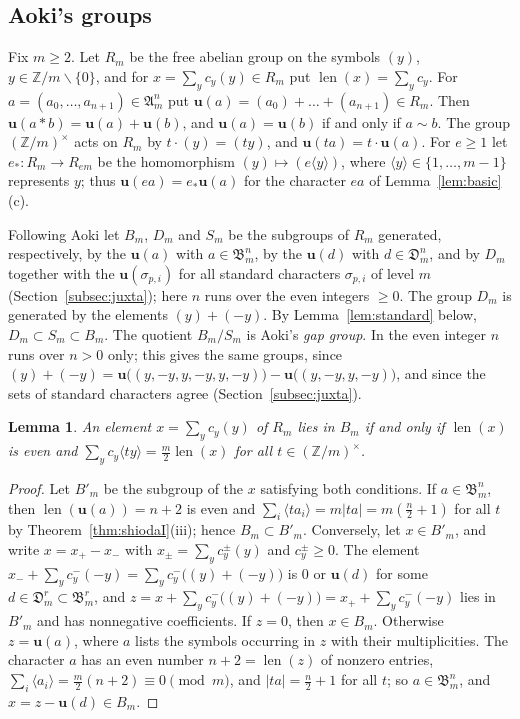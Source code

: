 \documentclass[11pt]{amsart}
\newtheorem{lemma}[theorem]{Lemma}
\theoremstyle{definition}
\theoremstyle{remark}
\numberwithin{equation}{section}
\newcommand{\Z}{\mathbb{Z}}
\newcommand{\fA}{\mathfrak{A}}
\newcommand{\fB}{\mathfrak{B}}
\newcommand{\fD}{\mathfrak{D}}
\newcommand{\uu}{\mathbf{u}}
\newcommand{\len}{\operatorname{len}}
\newcommand{\sm}{\smallsetminus}
\begin{document}
\subsection{Aoki's groups}\label{subsec:groups}
Fix $m\ge2$. Let $R_m$ be the free abelian group on the symbols $(y)$, $y\in\Z/m\sm\{0\}$, and for $x=\sum_yc_y(y)\in R_m$ put $\len(x)=\sum_yc_y$. For $a=(a_0,\dots,a_{n+1})\in\fA^n_m$ put $\uu(a)=(a_0)+\dots+(a_{n+1})\in R_m$. Then $\uu(a*b)=\uu(a)+\uu(b)$, and $\uu(a)=\uu(b)$ if and only if $a\sim b$. The group $(\Z/m)^\times$ acts on $R_m$ by $t\cdot(y)=(ty)$, and $\uu(ta)=t\cdot\uu(a)$. For $e\ge1$ let $e_*\colon R_m\to R_{em}$ be the homomorphism $(y)\mapsto(e\langle y\rangle)$, where $\langle y\rangle\in\{1,\dots,m-1\}$ represents $y$; thus $\uu(ea)=e_*\uu(a)$ for the character $ea$ of Lemma~\ref{lem:basic}(c).

Following Aoki \cite[Section~2]{Ao00} let $B_m$, $D_m$ and $S_m$ be the subgroups of $R_m$ generated, respectively, by the $\uu(a)$ with $a\in\fB^n_m$, by the $\uu(d)$ with $d\in\fD^n_m$, and by $D_m$ together with the $\uu(\sigma_{p,i})$ for all standard characters $\sigma_{p,i}$ of level $m$ (Section~\ref{subsec:juxta}); here $n$ runs over the even integers $\ge0$. The group $D_m$ is generated by the elements $(y)+(-y)$. By Lemma~\ref{lem:standard} below, $D_m\subset S_m\subset B_m$. The quotient $B_m/S_m$ is Aoki's \emph{gap group}. In \cite[Section~2]{Ao00} the even integer $n$ runs over $n>0$ only; this gives the same groups, since $(y)+(-y)=\uu\bigl((y,-y,y,-y,y,-y)\bigr)-\uu\bigl((y,-y,y,-y)\bigr)$, and since the sets of standard characters agree (Section~\ref{subsec:juxta}).

\begin{lemma}\label{lem:Blattice}
An element $x=\sum_yc_y(y)$ of $R_m$ lies in $B_m$ if and only if $\len(x)$ is even and $\sum_yc_y\langle ty\rangle=\frac m2\len(x)$ for all $t\in(\Z/m)^\times$.
\end{lemma}

\begin{proof}
Let $B'_m$ be the subgroup of the $x$ satisfying both conditions. If $a\in\fB^n_m$, then $\len(\uu(a))=n+2$ is even and $\sum_i\langle ta_i\rangle=m|ta|=m(\frac n2+1)$ for all $t$ by Theorem~\ref{thm:shiodaI}(iii); hence $B_m\subset B'_m$. Conversely, let $x\in B'_m$, and write $x=x_+-x_-$ with $x_\pm=\sum_yc^\pm_y(y)$ and $c^\pm_y\ge0$. The element $x_-+\sum_yc^-_y(-y)=\sum_yc^-_y\bigl((y)+(-y)\bigr)$ is $0$ or $\uu(d)$ for some $d\in\fD^r_m\subset\fB^r_m$, and $z=x+\sum_yc^-_y\bigl((y)+(-y)\bigr)=x_++\sum_yc^-_y(-y)$ lies in $B'_m$ and has nonnegative coefficients. If $z=0$, then $x\in B_m$. Otherwise $z=\uu(a)$, where $a$ lists the symbols occurring in $z$ with their multiplicities. The character $a$ has an even number $n+2=\len(z)$ of nonzero entries, $\sum_i\langle a_i\rangle=\frac m2(n+2)\equiv0\pmod m$, and $|ta|=\frac n2+1$ for all $t$; so $a\in\fB^n_m$, and $x=z-\uu(d)\in B_m$.
\end{proof}
\end{document}
